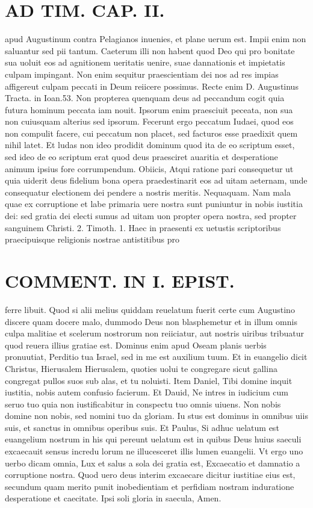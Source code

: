 \documentclass{article}
\begin{document}
\begin{pages}
\section*{AD TIM. CAP. II. }
\marginpar{[ p.116 ]}\pstart apud Augustinum contra Pelagianos inuenies, et plane uerum est. Impii enim non saluantur sed pii tantum. Caeterum illi non habent quod Deo qui pro bonitate sua uoluit eos ad agnitionem ueritatis uenire, suae dannationis et impietatis culpam impingant. Non enim sequitur praescientiam dei nos ad res impias affigereut culpam peccati in Deum reiicere possimus. Recte enim D. Augustinus Tracta. in Ioan.53. Non propterea quenquam deus ad peccandum cogit quia futura hominum peccata iam nouit. Ipsorum enim praesciuit peceata, non sua non cuiusquam alterius sed ipsorum. Fecerunt ergo peccatum Iudaei, quod eos non compulit facere, cui peccatum non placet, sed facturos esse praedixit quem nihil latet. Et ludas non ideo prodidit dominum quod ita de eo scriptum esset, sed ideo de eo scriptum erat quod deus praesciret auaritia et desperatione animum ipsius fore corrumpendum. Obiicis, Atqui ratione pari consequetur ut quia uiderit deus fidelium bona opera praedestinarit eos ad uitam aeternam, unde consequatur electionem dei pendere a nostris meritis. Nequaquam. Nam mala quae ex corruptione et labe primaria uere nostra sunt puniuntur in nobis iustitia dei: sed gratia dei electi sumus ad uitam uon propter opera nostra, sed propter sanguinem Christi. 2. Timoth. 1. Haec in praesenti ex uetustis scriptoribus praecipuisque religionis nostrae antistitibus pro  \pend
\section*{COMMENT. IN I. EPIST. }\pstart ferre libuit. Quod si alii melius quiddam reuelatum fuerit certe cum Augustino discere quam docere malo, dummodo Deus non blasphemetur et in illum omnis culpa malitiae et scelerum nostrorum non reiiciatur, aut nostris uiribus tribuatur quod reuera illius gratiae est. Dominus enim apud Oseam planis uerbis pronuutiat, Perditio tua Israel, sed in me est auxilium tuum. Et in euangelio dicit Christus, Hierusalem Hierusalem, quoties uolui te congregare sicut gallina congregat pullos suos sub alas, et tu noluisti. Item Daniel, Tibi domine inquit iustitia, nobis autem confusio facierum. Et Dauid, Ne intres in iudicium cum seruo tuo quia non iustificabitur in conspectu tuo omnis uiuens. Non nobis domine non nobis, sed nomini tuo da gloriam. Iu stus est dominus in omnibus uiis suis, et sanctus in omnibus operibus suis. Et Paulus, Si adhuc uelatum est euangelium nostrum in his qui pereunt uelatum est in quibus Deus huius saeculi excaecauit sensus incredu lorum ne illucesceret illis lumen euangelii. Vt ergo uno uerbo dicam omnia, Lux et salus a sola dei gratia est, Excaecatio et damnatio a corruptione nostra. Quod uero deus interim excaecare dicitur iustitiae eius est, secundum quam merito punit inobedientiam et perfidiam nostram induratione desperatione et caecitate. Ipsi soli gloria in saecula, Amen.  \pend

\end{pages}
\end{document}
